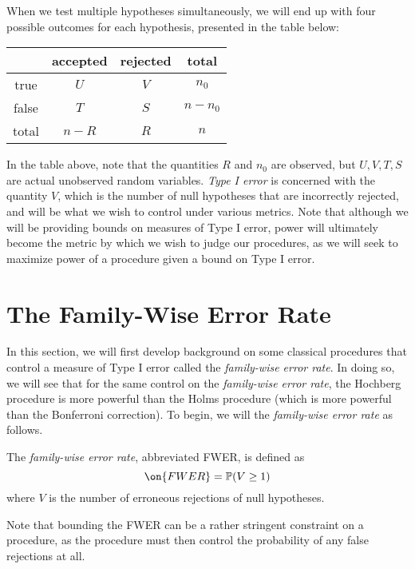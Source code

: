 \documentclass[11pt,reqno]{report}
\theoremstyle{definition}
\numberwithin{equation}{section}
\begin{document}
When we test multiple hypotheses simultaneously, we will end up with four possible outcomes for each hypothesis, presented in the table below:
\begin{center}
\begin{tabular}{c|cc|c}
& accepted & rejected & total \\ \hline
true & $U$ & $V$ & $n_0$ \\ 
false & $T$ & $S$ & $n - n_0$ \\ \hline
total & $n - R$ & $R$ & $n$
\end{tabular}
\end{center}
In the table above, note that the quantities $R$ and $n_0$ are observed, but $U,V,T,S$ are actual unobserved random variables. \emph{Type I error} is concerned with the quantity $V$, which is the number of null hypotheses that are incorrectly rejected, and will be what we wish to control under various metrics. Note that although we will be providing bounds on measures of Type I error, power will ultimately become the metric by which we wish to judge our procedures, as we will seek to maximize power of a procedure given a bound on Type I error.
\section{The Family-Wise Error Rate}
In this section, we will first develop background on some classical procedures that control a measure of Type I error called the \emph{family-wise error rate}. In doing so, we will see that for the same control on the \emph{family-wise error rate}, the Hochberg procedure is more powerful than the Holms procedure (which is more powerful than the Bonferroni correction). To begin, we will the \emph{family-wise error rate} as follows.
\begin{defn}
The \emph{family-wise error rate}, abbreviated FWER, is defined as
\begin{equation}
\on{FWER} = \mathbb{P}(V \geq  1)
\end{equation}
where $V$ is the number of erroneous rejections of null hypotheses.
\end{defn}
Note that bounding the FWER can be a rather stringent constraint on a procedure, as the procedure must then control the probability of any false rejections at all.
\end{document}
